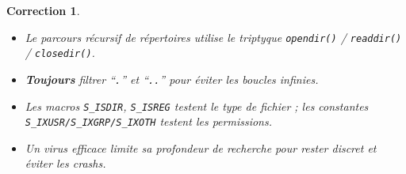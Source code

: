\documentclass[a4paper,11pt]{article}
\theoremstyle{plain}
\newtheorem{correction}{Correction}
\theoremstyle{definition}
\begin{document}
\begin{correction}
\begin{enumerate}
\end{enumerate}

\begin{pointcle}
\begin{itemize}
    \item Le parcours récursif de répertoires utilise le triptyque \texttt{opendir()} / \texttt{readdir()} / \texttt{closedir()}.
    \item \textbf{Toujours} filtrer ``\texttt{.}'' et ``\texttt{..}'' pour éviter les boucles infinies.
    \item Les macros \texttt{S\_ISDIR}, \texttt{S\_ISREG} testent le \textit{type} de fichier ; les constantes \texttt{S\_IXUSR/S\_IXGRP/S\_IXOTH} testent les \textit{permissions}.
    \item Un virus efficace limite sa profondeur de recherche pour rester discret et éviter les crashs.
\end{itemize}
\end{pointcle}

\end{correction}

\bigskip

\end{document}
